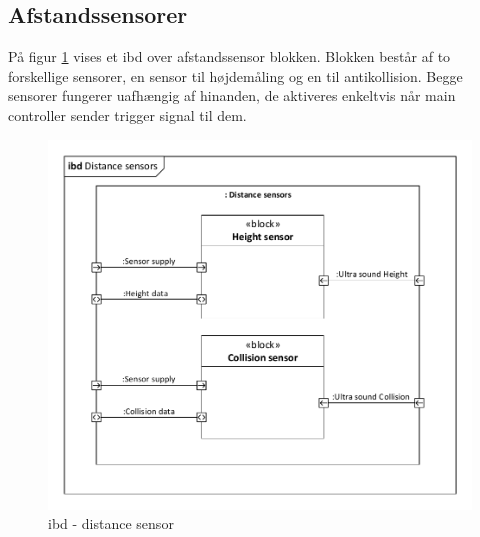 \subsection{Afstandssensorer}

På figur \ref{fig:ibd_distancesensor} vises et ibd over afstandssensor blokken. 
Blokken består af to forskellige sensorer, en sensor til højdemåling og en til antikollision. Begge sensorer fungerer uafhængig af hinanden, de aktiveres enkeltvis når main controller sender trigger signal til dem.   

\begin{figure}[H]
\centering
\includegraphics[width=1\textwidth]{Billeder/IBD/ibd4_distancesensor.pdf}
\vspace{-1cm}
\caption{ibd - distance sensor}
\label{fig:ibd_distancesensor}
\end{figure}

